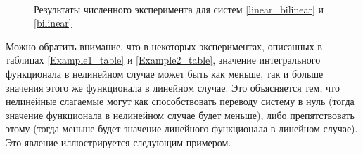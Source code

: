 \documentclass[../main.tex]{subfiles}
\begin{document}
\begin{figure}[ht!]
\begin{minipage}[b]{.49\linewidth}
%
			\label{fig:bilinear_T=3}  
		\end{minipage} 
		\caption{Результаты численного эксперимента для систем \eqref{linear_bilinear} и   \eqref{bilinear}}\label{fig:bilinear}
	\end{figure}
	
	Можно обратить внимание, что в некоторых экспериментах, описанных в таблицах \ref{Example1_table} и \ref{Example2_table}, значение интегрального функционала в нелинейном случае может быть как меньше, так и больше значения этого же функционала в линейном случае. Это объясняется тем, что нелинейные слагаемые могут как способствовать переводу систему в нуль (тогда значение функционала в нелинейном случае будет меньше), либо препятствовать этому (тогда меньше будет значение линейного функционала в линейном случае). Это явление иллюстрируется следующим примером.
	
\end{document}
